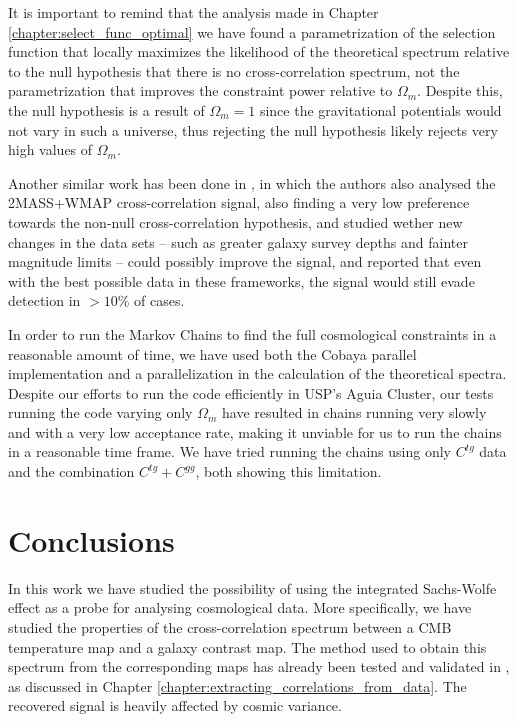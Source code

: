 \documentclass[openany,a4paper,12pt,oneside]{book}
\begin{document}
\begin{spacing}{1.5}
It is important to remind that the analysis made in Chapter \ref{chapter:select_func_optimal} we have found a parametrization of the selection function that locally maximizes the likelihood of the theoretical spectrum relative to the null hypothesis that there is no cross-correlation spectrum, not the parametrization that improves the constraint power relative to $\Omega_m$. Despite this, the null hypothesis is a result of $\Omega_m=1$ since the gravitational potentials would not vary in such a universe\cite{ronaldo_inhDE}, thus rejecting the null hypothesis likely rejects very high values of $\Omega_m$.

Another similar work has been done in \cite{simillar_ISW_analysis}, in which the authors also analysed the 2MASS+WMAP cross-correlation signal, also finding a very low preference towards the non-null cross-correlation hypothesis, and studied wether new changes in the data sets -- such as greater galaxy survey depths and fainter magnitude limits -- could possibly improve the signal, and reported that even with the best possible data in these frameworks, the signal would still evade detection in $>10\%$ of cases.

In order to run the Markov Chains to find the full cosmological constraints in a reasonable amount of time, we have used both the Cobaya parallel implementation and a parallelization in the calculation of the theoretical spectra. Despite our efforts to run the code efficiently in USP's Aguia Cluster, our tests running the code varying only $\Omega_m$ have resulted in chains running very slowly and with a very low acceptance rate, making it unviable for us to run the chains in a reasonable time frame. We have tried running the chains using only $C^{tg}$ data and the combination $C^{tg}+C^{gg}$, both showing this limitation.

\chapter{Conclusions}\label{chapter:conclusions}

In this work we have studied the possibility of using the integrated Sachs-Wolfe effect as a probe for analysing cosmological data. More specifically, we have studied the properties of the cross-correlation spectrum between a CMB temperature map and a galaxy contrast map. The method used to obtain this spectrum from the corresponding maps has already been tested and validated in \cite{Moura-Santos_2016}, as discussed in Chapter \ref{chapter:extracting_correlations_from_data}. The recovered signal is heavily affected by cosmic variance.


\end{spacing}
\end{document}
